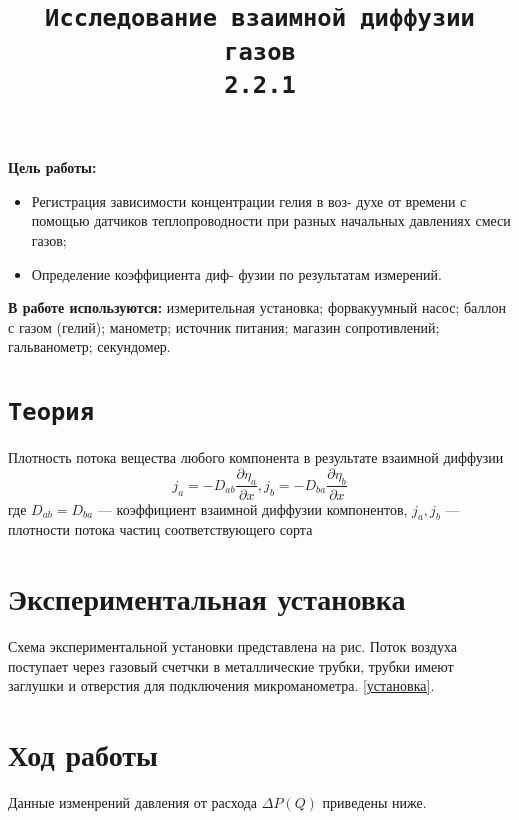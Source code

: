 

\title{\texttt{Исследование взаимной диффузии газов \\ 2.2.1}}
\author{}
\date{}


  \maketitle

\textbf{Цель работы:} 
\begin{itemize}
  \item  Регистрация зависимости концентрации гелия в воз-
  духе от времени с помощью датчиков теплопроводности при разных
  начальных давлениях смеси газов; 
  \item Определение коэффициента диф-
  фузии по результатам измерений.
\end{itemize}
\textbf{В работе используются:}  измерительная установка; форвакуумный
насос; баллон с газом (гелий); манометр; источник питания; магазин
сопротивлений; гальванометр; секундомер.

\section*{\texttt{Теория}}
Плотность потока вещества любого компонента в результате взаимной диффузии
\begin{equation}
  j_a = -D_{ab}\frac{\partial \eta_a}{\partial x}, 
  j_b = -D_{ba}\frac{\partial \eta_b}{\partial x}
\end{equation}
где $D_{ab} = D_{ba}$ — коэффициент взаимной диффузии компонентов,
$j_a, j_b$ — плотности потока частиц соответствующего сорта
\section*{Экспериментальная установка}
Схема экспериментальной установки представлена на рис. Поток воздуха поступает через газовый счетчки в металлические трубки, трубки имеют заглушки и отверстия для подключения микроманометра.  \ref{установка}. 

\section*{Ход работы}

Данные изменрений давления от расхода $\Delta P (Q)$ приведены ниже. 

